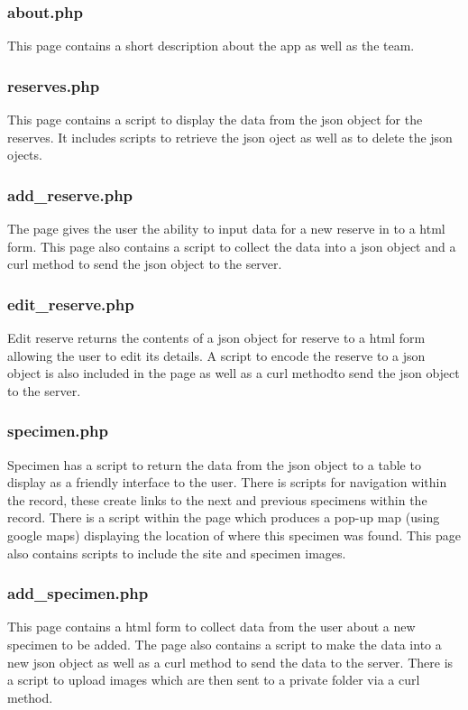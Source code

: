         
    \subsubsection{about.php}
        This page contains a short description about the app as well as the team.

        
    \subsubsection{reserves.php}
        This page contains a script to display the data from the json object for the reserves. It includes scripts to retrieve the json oject as well as to delete the json ojects.

        
    \subsubsection{add\_reserve.php}
        The page gives the user the ability to input data for a new reserve in to a html form. This page also contains a script to collect the data into a json object and a curl method to send the json object to the server.

        
    \subsubsection{edit\_reserve.php}
        Edit reserve returns the contents of a json object for reserve to a html form allowing the user to edit its details. A script to encode the reserve to a json object is also included in the page as well as a curl methodto send the json object to the server.

        
    \subsubsection{specimen.php}
        Specimen has a script to return the data from the json object to a table to display as a friendly interface to the user. There is scripts for navigation within the record, these create links to the next and previous specimens within the record. There is a script within the page which produces a pop-up map (using google maps) displaying the location of where this specimen was found. This page also contains scripts to include the site and specimen images.

        
    \subsubsection{add\_specimen.php}
        This page contains a html form to collect data from the user about a new specimen to be added. The page also contains a script to make the data into a new json object as well as a curl method to send the data to the server. There is a script to upload images which are then sent to a private folder via a curl method.


